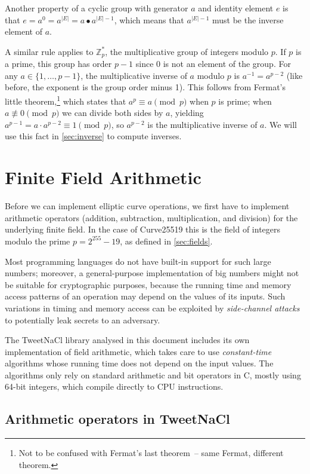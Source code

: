 \documentclass{article}
\begin{document}
Another property of a cyclic group with generator $a$ and identity element $e$ is that $e = a^0 = a^{|E|} = a \bullet a^{|E|-1}$, which means that $a^{|E|-1}$ must be the inverse element of $a$.

A similar rule applies to $\mathbb{Z}_p^*$, the multiplicative group of integers modulo $p$.
If $p$ is a prime, this group has order $p-1$ since 0 is not an element of the group.
For any $a \in \{1, \dots, p-1\}$, the multiplicative inverse of $a$ modulo $p$ is $a^{-1} = a^{p-2}$ (like before, the exponent is the group order minus 1).
This follows from Fermat's little theorem,\footnote{Not to be confused with Fermat's last theorem~-- same Fermat, different theorem.} which states that $a^p \equiv a \pmod{p}$ when $p$ is prime; when $a \not\equiv 0 \pmod{p}$ we can divide both sides by $a$, yielding $a^{p-1} = a \cdot a^{p-2} \equiv 1 \pmod{p}$, so $a^{p-2}$ is the multiplicative inverse of $a$.
We will use this fact in \autoref{sec:inverse} to compute inverses.


\section{Finite Field Arithmetic}\label{sec:field-arithmetic}

Before we can implement elliptic curve operations, we first have to implement arithmetic operators (addition, subtraction, multiplication, and division) for the underlying finite field.
In the case of Curve25519 this is the field of integers modulo the prime $p = 2^{255} - 19$, as defined in \autoref{sec:fields}.

Most programming languages do not have built-in support for such large numbers; moreover, a general-purpose implementation of big numbers might not be suitable for cryptographic purposes, because the running time and memory access patterns of an operation may depend on the values of its inputs.
Such variations in timing and memory access can be exploited by \emph{side-channel attacks} to potentially leak secrets to an adversary.

The TweetNaCl library analysed in this document includes its own implementation of field arithmetic, which takes care to use \emph{constant-time} algorithms whose running time does not depend on the input values.
The algorithms only rely on standard arithmetic and bit operators in C, mostly using 64-bit integers, which compile directly to CPU instructions.

\subsection{Arithmetic operators in TweetNaCl}
\end{document}
